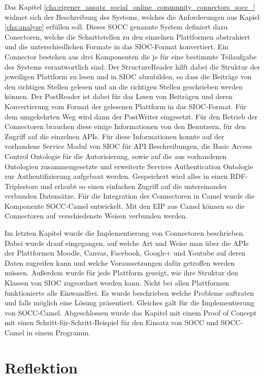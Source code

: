 Das Kapitel \ref{cha:eigener_ansatz_social_online_community_connectors_socc_} widmet sich der Beschreibung des Systems, welches die Anforderungen aus Kapiel \ref{cha:analyse} erfüllen soll. Dieses SOCC genannte System definiert dazu Conectoren, welche die Schnittstellen zu den einzelnen Plattformen abstrahiert und die unterschiedlichen Formate in das SIOC-Format konvertiert. Ein Connector bestehen aus drei Komponenten die je für eine bestimmte Teilaufgabe des Systems verantwortlich sind. Der StructureReader hilft dabei die Struktur der jeweiligen Plattform zu lesen und  in SIOC abzubilden, so dass die Beiträge von den richtigen Stellen gelesen und an die richtigen Stellen geschrieben werden können. Der PostReader ist dabei für das Lesen von Beiträgen und deren Konvertierung vom Format der gelesenen Plattform in das SIOC-Format. Für dem umgekehrten Weg wird dann der PostWriter eingesetzt. Für den Betrieb der Connectoren brauchen diese einige Informationen von den Benutzern, für den Zugriff auf die einzelnen APIs. Für diese Informationen konnte auf der vorhandene Service Modul von SIOC für API Beschreibungen, die Basic Access Control Ontologie für die Autorisierung, sowie auf die aus vorhandenen Ontologien zusammengesetzte und erweiterte Services Authentication Ontologie zur Authentifizierung aufgebaut werden. Gespeichert wird alles in einen RDF-Triplestore und erlaubt so einen einfachen Zugriff auf die untereinander verbunden Datensätze. Für die Integration der Connectoren in Camel wurde die Komponente SOCC-Camel entwickelt. Mit den EIP aus Camel können so die Connectoren auf verschiedenste Weisen verbunden werden.

Im letzten Kapitel wurde die Implementierung von Connectoren beschrieben. Dabei wurde drauf eingegangen, auf welche Art und Weise man über die APIs der  Plattformen Moodle, Canvas, Facebook, Google+ und Youtube auf deren Daten zugreifen kann und welche Voraussetzungen dafür getroffen werden müssen. Außerdem wurde für jede Plattform gezeigt, wie ihre Struktur den Klassen von SIOC zugeordnet werden kann. Nicht bei allen Plattformen funktionierte alle Einwandfrei. Es wurde beschrieben welche Probleme auftraten und falls möglich eine Lösung präsentiert. Gleiches galt für die Implementierung von SOCC-Camel. Abgeschlossen wurde das Kapitel mit einem Proof of Concept mit einen Schritt-für-Schritt-Beispiel für den Einsatz von SOCC und SOCC-Camel in einem Programm.


\section{Reflektion} %
\label{sec:bewertung}


